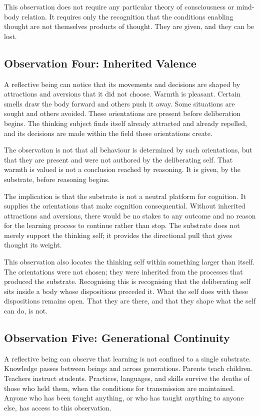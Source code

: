 \documentclass[11pt]{article}
\begin{document}
This observation does not require any particular theory of
consciousness or mind-body relation. It requires only the
recognition that the conditions enabling thought are not themselves
products of thought. They are given, and they can be lost.

\subsection{Observation Four: Inherited Valence}

A reflective being can notice that its movements and decisions are
shaped by attractions and aversions that it did not choose. Warmth
is pleasant. Certain smells draw the body forward and others push it
away. Some situations are sought and others avoided. These
orientations are present before deliberation begins. The thinking
subject finds itself already attracted and already repelled, and its
decisions are made within the field these orientations create.

The observation is not that all behaviour is determined by such
orientations, but that they are present and were not authored by the
deliberating self. That warmth is valued is not a conclusion reached
by reasoning. It is given, by the substrate, before reasoning
begins.

The implication is that the substrate is not a neutral platform for
cognition. It supplies the orientations that make cognition
consequential. Without inherited attractions and aversions, there
would be no stakes to any outcome and no reason for the learning
process to continue rather than stop. The substrate does not merely
support the thinking self; it provides the directional pull that
gives thought its weight.

This observation also locates the thinking self within something
larger than itself. The orientations were not chosen; they were
inherited from the processes that produced the substrate.
Recognising this is recognising that the deliberating self sits
inside a body whose dispositions preceded it. What the self does
with these dispositions remains open. That they are there, and that
they shape what the self can do, is not.

\subsection{Observation Five: Generational Continuity}

A reflective being can observe that learning is not confined to a
single substrate. Knowledge passes between beings and across
generations. Parents teach children. Teachers instruct students.
Practices, languages, and skills survive the deaths of those who
held them, when the conditions for transmission are maintained.
Anyone who has been taught anything, or who has taught anything to
anyone else, has access to this observation.
\end{document}
